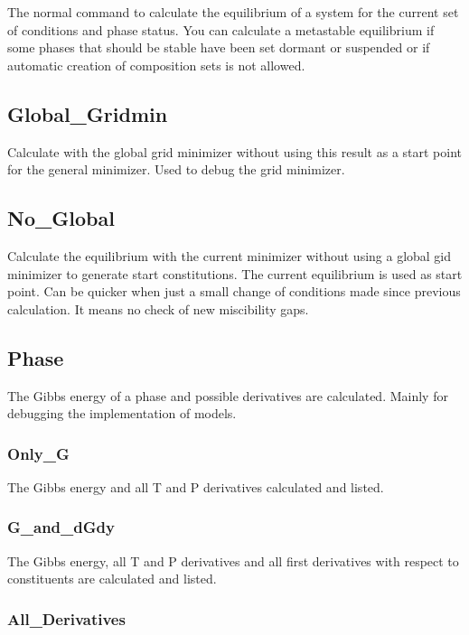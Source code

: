 \documentclass[12pt]{article}
\begin{document}
The normal command to calculate the equilibrium of a system for the
current set of conditions and phase status.  You can calculate a
metastable equilibrium if some phases that should be stable have been
set dormant or suspended or if automatic creation of composition sets
is not allowed.

\subsection{Global\_Gridmin}

Calculate with the global grid minimizer without using this result as a
start point for the general minimizer.  Used to debug the grid
minimizer.

\subsection{No\_Global}

Calculate the equilibrium with the current minimizer without using a
global gid minimizer to generate start constitutions.  The current
equilibrium is used as start point.  Can be quicker when just a small
change of conditions made since previous calculation.  It means no
check of new miscibility gaps.

\subsection{Phase}

The Gibbs energy of a phase and possible derivatives are calculated.
Mainly for debugging the implementation of models.

\subsubsection{Only\_G}

The Gibbs energy and all T and P derivatives calculated and listed.

\subsubsection{G\_and\_dGdy}

The Gibbs energy, all T and P derivatives and all first
derivatives with respect to constituents are calculated and listed.

\subsubsection{All\_Derivatives}
\end{document}
